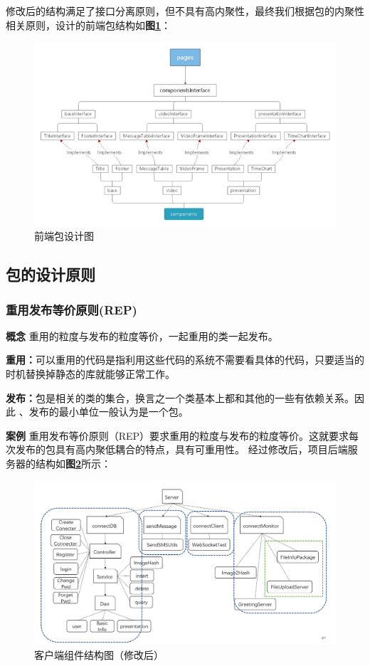 \documentclass[article]{BJTU-thesis}
\begin{document}
\newpage

修改后的结构满足了接口分离原则，但不具有高内聚性，最终我们根据包的内聚性相关原则，设计的前端包结构如\textbf{图\ref{fig:fig15}}：

\begin{figure}[!htbp]
	\centering
	\includegraphics[scale=0.7]{img/14.png}
	\caption{前端包设计图}\label{fig:fig15}
\end{figure}

\subsection{包的设计原则}

\subsubsection{重用发布等价原则(REP)}
\textbf{概念} 重用的粒度与发布的粒度等价，一起重用的类一起发布。

\textbf{重用：}可以重用的代码是指利用这些代码的系统不需要看具体的代码，只要适当的时机替换掉静态的库就能够正常工作。

\textbf{发布：}包是相关的类的集合，换言之一个类基本上都和其他的一些有依赖关系。因此 、发布的最小单位一般认为是一个包。

\textbf{案例} 重用发布等价原则（REP）要求重用的粒度与发布的粒度等价。这就要求每次发布的包具有高内聚低耦合的特点，具有可重用性。
经过修改后，项目后端服务器的结构如\textbf{图\ref{fig:fig10}}所示：

\begin{figure}[!htbp]
	\centering
	\includegraphics[scale=0.6]{img/10.png}
	\caption{客户端组件结构图（修改后）}\label{fig:fig10}
\end{figure}
\end{document}
